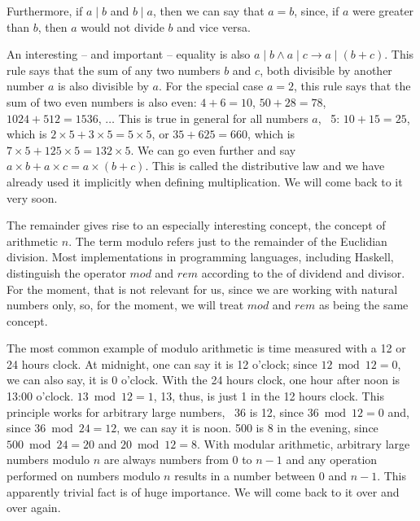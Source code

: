 \documentclass{scrreprt}
\newcommand{\Varid}[1]{\mathit{#1}}
\begin{document}
Furthermore, if $a \mid b$ and $b \mid a$,
then we can say that $a = b$,
since, if $a$ were greater than $b$,
then $a$ would not divide $b$
and vice versa. 

An interesting -- and important --
equality is also
$a \mid b \wedge a \mid c \rightarrow a \mid (b + c)$.
This rule says that the sum of any two numbers \ensuremath{\Varid{b}} and \ensuremath{\Varid{c}},
both divisible by another number \ensuremath{\Varid{a}}
is also divisible by \ensuremath{\Varid{a}}.
For the special case $a = 2$, this rule says
that the sum of two even numbers is also even:
$4 + 6 = 10$, $50 + 28 = 78$, $1024 + 512 = 1536$, $\dots$
This is true in general for all numbers $a$, \eg\ 5:
$10 + 15 = 25$, which is $2 \times 5 + 3 \times 5 = 5 \times 5$, or
$35 + 625 = 660$, which is $7 \times 5 + 125 \times 5 = 132 \times 5$.
We can go even further and say 
$a \times b + a \times c = a \times (b + c)$.
This is called the distributive law
and we have already used it implicitly when defining multiplication.
We will come back to it very soon.

The remainder gives rise to an especially interesting concept,
the concept of arithmetic  $n$.
The term modulo refers just to the remainder of the Euclidian division.
Most implementations in programming languages,
including Haskell, distinguish the operator \ensuremath{\Varid{mod}} and \ensuremath{\Varid{rem}}
according to the  of dividend and divisor.
For the moment, that is not relevant for us,
since we are working with natural numbers only, so,
for the moment, we will treat \ensuremath{\Varid{mod}} and \ensuremath{\Varid{rem}} 
as being the same concept.

The most common example of modulo arithmetic
is time measured with a 12 or 24 hours clock.
At midnight, one can say it is 12 o'clock;
since $12 \bmod 12  = 0$,
we can also say, it is 0 o'clock.
With the 24 hours clock, one hour after
noon is 13:00 o'clock. $13 \bmod 12 = 1$,
13, thus, is just 1 in the 12 hours clock.
This principle works for arbitrary large numbers,
\eg\ 36 is 12, since $36 \bmod 12 = 0$
and, since $36 \bmod 24 = 12$, we can say it is noon.
500 is 8 in the evening, since $500 \bmod 24 = 20$
and $20 \bmod 12 = 8$.
With modular arithmetic, arbitrary large numbers
modulo $n$ are always numbers from 0 to $n - 1$
and any operation performed on numbers modulo $n$
results in a number between 0 and $n - 1$.
This apparently trivial fact is of huge importance.
We will come back to it over and over again.
\end{document}
